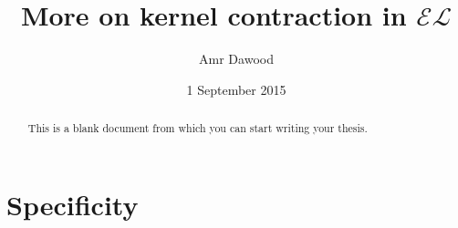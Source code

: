 \documentclass{sfuthesis}
\title{More on kernel contraction in $\mathcal{EL}$}
\author{Amr Dawood}
\date{1 September 2015}
\theoremstyle{plain}
\theoremstyle{definition}
\begin{document}
\frontmatter
\maketitle{}
\makecommittee{}

\begin{abstract}
	This is a blank document from which you can start writing your thesis.
\end{abstract}


\begin{dedication} %
\end{dedication}


\begin{acknowledgements} %
\end{acknowledgements}

\tableofcontents\clearpage
{}\listoftables\clearpage
{}\listoffigures





%
%

\mainmatter%













\section{Specificity}
\end{document}
